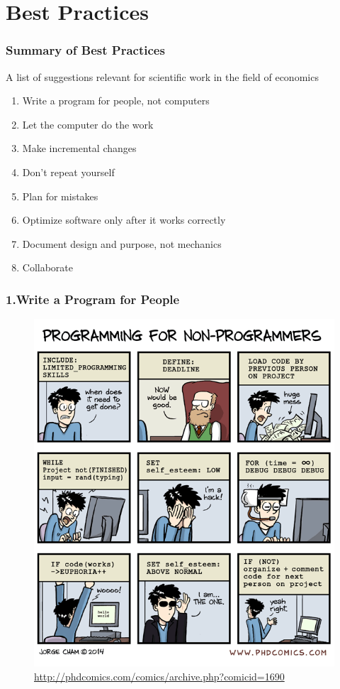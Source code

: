 \documentclass{beamer}
\begin{document}
\section{Best Practices}
\begin{frame}
\frametitle{Summary of Best Practices}
A list of suggestions relevant for scientific work in the field of economics
\begin{enumerate}
\item Write a program for people, not computers
\item Let the computer do the work
\item Make incremental changes
\item Don't repeat yourself
\item Plan for mistakes
\item Optimize software only after it works correctly
\item Document design and purpose, not mechanics
\item Collaborate
\end{enumerate}
\end{frame}
\begin{frame}
\frametitle{1.Write a Program for People}
\begin{figure}
\includegraphics[scale=0.3]{phd031714s}
\caption{\url{http://phdcomics.com/comics/archive.php?comicid=1690}}
\end{figure}
\end{frame}
\end{document}
